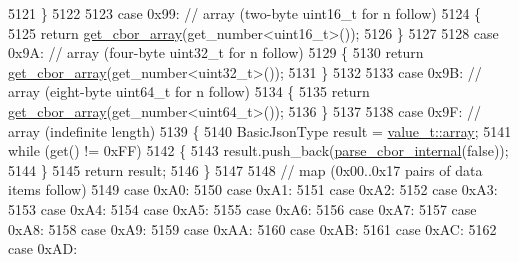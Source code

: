 \begin{DoxyCode}
5121             \}
5122 
5123             \textcolor{keywordflow}{case} 0x99: \textcolor{comment}{// array (two-byte uint16\_t for n follow)}
5124             \{
5125                 \textcolor{keywordflow}{return} \hyperlink{classnlohmann_1_1detail_1_1binary__reader_a3ee69f0eabc2325477dd00689a00449b}{get\_cbor\_array}(get\_number<uint16\_t>());
5126             \}
5127 
5128             \textcolor{keywordflow}{case} 0x9A: \textcolor{comment}{// array (four-byte uint32\_t for n follow)}
5129             \{
5130                 \textcolor{keywordflow}{return} \hyperlink{classnlohmann_1_1detail_1_1binary__reader_a3ee69f0eabc2325477dd00689a00449b}{get\_cbor\_array}(get\_number<uint32\_t>());
5131             \}
5132 
5133             \textcolor{keywordflow}{case} 0x9B: \textcolor{comment}{// array (eight-byte uint64\_t for n follow)}
5134             \{
5135                 \textcolor{keywordflow}{return} \hyperlink{classnlohmann_1_1detail_1_1binary__reader_a3ee69f0eabc2325477dd00689a00449b}{get\_cbor\_array}(get\_number<uint64\_t>());
5136             \}
5137 
5138             \textcolor{keywordflow}{case} 0x9F: \textcolor{comment}{// array (indefinite length)}
5139             \{
5140                 BasicJsonType result = \hyperlink{namespacenlohmann_1_1detail_a1ed8fc6239da25abcaf681d30ace4985af1f713c9e000f5d3f280adbd124df4f5}{value\_t::array};
5141                 \textcolor{keywordflow}{while} (\textcolor{keyword}{get}() != 0xFF)
5142                 \{
5143                     result.push\_back(\hyperlink{classnlohmann_1_1detail_1_1binary__reader_a0d919ee892fbbeedb27ff95c4e4010e1}{parse\_cbor\_internal}(\textcolor{keyword}{false}));
5144                 \}
5145                 \textcolor{keywordflow}{return} result;
5146             \}
5147 
5148             \textcolor{comment}{// map (0x00..0x17 pairs of data items follow)}
5149             \textcolor{keywordflow}{case} 0xA0:
5150             \textcolor{keywordflow}{case} 0xA1:
5151             \textcolor{keywordflow}{case} 0xA2:
5152             \textcolor{keywordflow}{case} 0xA3:
5153             \textcolor{keywordflow}{case} 0xA4:
5154             \textcolor{keywordflow}{case} 0xA5:
5155             \textcolor{keywordflow}{case} 0xA6:
5156             \textcolor{keywordflow}{case} 0xA7:
5157             \textcolor{keywordflow}{case} 0xA8:
5158             \textcolor{keywordflow}{case} 0xA9:
5159             \textcolor{keywordflow}{case} 0xAA:
5160             \textcolor{keywordflow}{case} 0xAB:
5161             \textcolor{keywordflow}{case} 0xAC:
5162             \textcolor{keywordflow}{case} 0xAD:

\end{DoxyCode}
